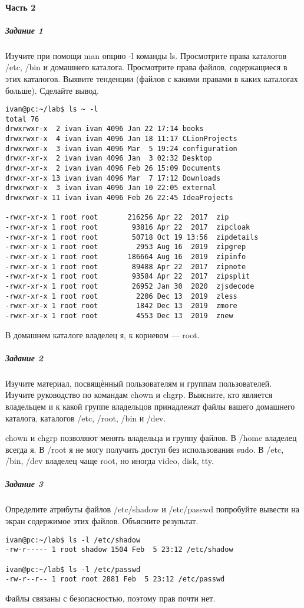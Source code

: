 \paragraph{Часть 2}
\subparagraph{Задание 1}

Изучите при помощи man опцию -l команды ls. Просмотрите права каталогов
/etc, /bin и домашнего каталога. Просмотрите права файлов, содержащиеся в этих
каталогов. Выявите тенденции (файлов с какими правами в каких каталогах больше).
Сделайте вывод.

\begin{verbatim}
ivan@pc:~/lab$ ls ~ -l
total 76
drwxrwxr-x  2 ivan ivan 4096 Jan 22 17:14 books
drwxrwxr-x  4 ivan ivan 4096 Jan 18 11:17 CLionProjects
drwxrwxr-x  3 ivan ivan 4096 Mar  5 19:24 configuration
drwxr-xr-x  2 ivan ivan 4096 Jan  3 02:32 Desktop
drwxr-xr-x  2 ivan ivan 4096 Feb 26 15:09 Documents
drwxr-xr-x 13 ivan ivan 4096 Mar  7 17:12 Downloads
drwxrwxr-x  3 ivan ivan 4096 Jan 10 22:05 external
drwxrwxr-x 11 ivan ivan 4096 Feb 26 22:45 IdeaProjects

-rwxr-xr-x 1 root root       216256 Apr 22  2017  zip
-rwxr-xr-x 1 root root        93816 Apr 22  2017  zipcloak
-rwxr-xr-x 1 root root        50718 Oct 19 13:56  zipdetails
-rwxr-xr-x 1 root root         2953 Aug 16  2019  zipgrep
-rwxr-xr-x 1 root root       186664 Aug 16  2019  zipinfo
-rwxr-xr-x 1 root root        89488 Apr 22  2017  zipnote
-rwxr-xr-x 1 root root        93584 Apr 22  2017  zipsplit
-rwxr-xr-x 1 root root        26952 Jan 30  2020  zjsdecode
-rwxr-xr-x 1 root root         2206 Dec 13  2019  zless
-rwxr-xr-x 1 root root         1842 Dec 13  2019  zmore
-rwxr-xr-x 1 root root         4553 Dec 13  2019  znew
\end{verbatim}

В домашнем каталоге владелец я, к корневом --- root.

\subparagraph{Задание 2}
Изучите материал, посвящѐнный пользователям и группам пользователей.
Изучите руководство по командам chown и chgrp. Выясните, кто является владельцем и
к какой группе владельцов принадлежат файлы вашего домашнего каталога, каталогов
/etc, /root, /bin и /dev.

chown и chgrp позволяют менять владельца и группу файлов.
В /home владелец всегда я.
В /root я не могу получить доступ без использования sudo.
В /etc, /bin, /dev владелец чаще root, но иногда video, disk, tty.

\subparagraph{Задание 3}
Определите атрибуты файлов /etc/shadow и /etc/passwd попробуйте вывести на
экран содержимое этих файлов. Объясните результат.
\begin{verbatim}
ivan@pc:~/lab$ ls -l /etc/shadow
-rw-r----- 1 root shadow 1504 Feb  5 23:12 /etc/shadow

ivan@pc:~/lab$ ls -l /etc/passwd
-rw-r--r-- 1 root root 2881 Feb  5 23:12 /etc/passwd
\end{verbatim}
Файлы связаны с безопасностью, поэтому прав почти нет.

